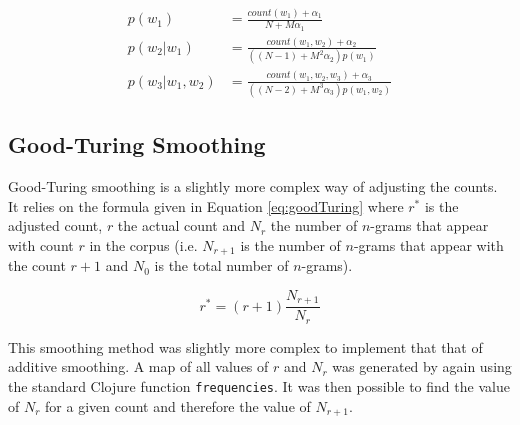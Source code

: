 \begin{subequations}
\begin{align}
p(w_{1})&=\frac{count(w_{1})+\alpha_{1}}{N+M\alpha_{1}} \label{eq:1-gramAdditiveSmoothing}
\\
p(w_{2}| w_{1})&=\frac{count(w_{1}, w_{2})+\alpha_{2}}{((N-1)+M^{2}\alpha_{2})p(w_{1})} \label{eq:2-gramAdditiveSmoothing}
\\
p(w_{3}| w_{1}, w_{2}) &= \frac{count(w_{1}, w_{2}, w_{3})+\alpha_{3}}{((N-2)+M^{3}\alpha_{3})p(w_{1}, w_{2})} \label{eq:3-gramAdditiveSmoothing}
\end{align}
\end{subequations}

%
%

\subsection{Good-Turing Smoothing} \label{sec:goodTuringSmoothing}

Good-Turing smoothing is a slightly more complex way of adjusting the counts. It relies on the formula given in Equation \ref{eq:goodTuring} where $r^{*}$ is the adjusted count, $r$ the actual count and $N_{r}$ the number of $n$-grams that appear with count $r$ in the corpus (i.e. $N_{r+1}$ is the number of $n$-grams that appear with the count $r+1$ and $N_{0}$ is the total number of $n$-grams).

\begin{equation}
r^{*}=(r+1)\frac{N_{r+1}}{N_{r}}
\label{eq:goodTuring}
\end{equation}


This smoothing method was slightly more complex to implement that that of additive smoothing. A map of all values of $r$ and $N_{r}$ was generated by again using the standard Clojure function \lstinline!frequencies!. It was then possible to find the value of $N_{r}$ for a given count and therefore the value of $N_{r+1}$. 


